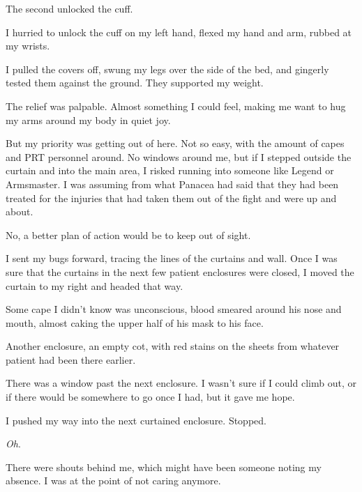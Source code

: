 The second unlocked the cuff.



I hurried to unlock the cuff on my left hand, flexed my hand and arm, rubbed at my wrists.



I pulled the covers off, swung my legs over the side of the bed, and gingerly tested them against the ground.  They supported my weight.



The relief was palpable.  Almost something I could feel, making me want to hug my arms around my body in quiet joy.



But my priority was getting out of here.  Not so easy, with the amount of capes and PRT personnel around.  No windows around me, but if I stepped outside the curtain and into the main area, I risked running into someone like Legend or Armsmaster.  I was assuming from what Panacea had said that they had been treated for the injuries that had taken them out of the fight and were up and about.



No, a better plan of action would be to keep out of sight.



I sent my bugs forward, tracing the lines of the curtains and wall.  Once I was sure that the curtains in the next few patient enclosures were closed, I moved the curtain to my right and headed that way.



Some cape I didn't know was unconscious, blood smeared around his nose and mouth, almost caking the upper half of his mask to his face.



Another enclosure, an empty cot, with red stains on the sheets from whatever patient had been there earlier.



There was a window past the next enclosure.  I wasn't sure if I could climb out, or if there would be somewhere to go once I had, but it gave me hope.



I pushed my way into the next curtained enclosure.  Stopped.



\emph{Oh}.



There were shouts behind me, which might have been someone noting my absence.  I was at the point of not caring anymore.



